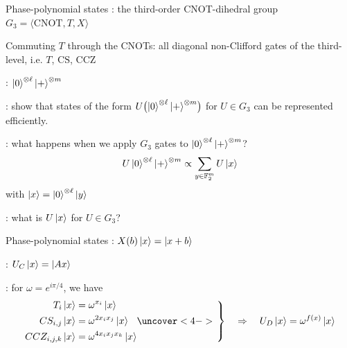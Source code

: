 \documentclass[aspectratio=169,11pt,t]{beamer}
\begin{document}
\outlineslide


\begin{frame}{Phase-polynomial states}
    : the third-order CNOT-dihedral group
    $G_3=\langle \text{CNOT}, T, X \rangle$

    \pause
    Commuting $T$ through the CNOTs: all diagonal non-Clifford gates of the third-level, i.e. $T$, $\text{CS}$, $\text{CCZ}$

    \pause
    : $\ket{0}^{\otimes \ell} \ket{+}^{\otimes m}$

    \pause
    : show that states of the form $U \bigl(\ket{0}^{\otimes \ell} \ket{+}^{\otimes m}\bigr)$ for $U \in G_3$ can be represented efficiently.

    \pause
    : what happens when we apply $G_3$ gates to $\ket{0}^{\otimes \ell} \ket{+}^{\otimes m}$?
    $$
    U\ket{0}^{\otimes \ell} \ket{+}^{\otimes m} \propto \sum_{y\in \mathbb{F}_2^m} U \ket{x}
    $$
    with $\ket{x}= \ket{0}^{\otimes \ell} \ket{y}$

    \pause
    : what is $U \ket{x}$ for $U \in G_3$?
\end{frame}

\begin{frame}{Phase-polynomial states}
  :
  $X(b)\ket{x}=\ket{x+b}$

  \pause
  :
  $U_C\ket{x}=\ket{Ax}$

  \pause
  : for $\omega=e^{i\pi/4}$, we have
  \newcommand{\diagonalGateActions}{%
    \begin{aligned}
      T_i\ket{x}&=\omega^{x_i}\ket{x} \\
      CS_{i,j}\ket{x}&=\omega^{2 x_i x_j}\ket{x} \\
      CCZ_{i,j,k}\ket{x}&=\omega^{4 x_i x_j x_k}\ket{x}
    \end{aligned}%
  }
  \[
    \diagonalGateActions
    \uncover<4->{%
      \left.\vphantom{\diagonalGateActions}\right\}
      \quad\Rightarrow\quad U_D\ket{x}=\omega^{f(x)}\ket{x}%
    }
  \]
\end{frame}
\end{document}
